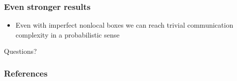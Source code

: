 \documentclass{beamer}
\begin{document}
\begin{frame}\frametitle{Even stronger results}
  \begin{itemize}
    \item Even with imperfect nonlocal boxes we can reach trivial communication
          complexity in a probabilistic sense
  \end{itemize}
\end{frame}

\begin{frame}
  \begin{center}
    Questions?
  \end{center}
\end{frame}

\begin{frame}[allowframebreaks]\frametitle{References}
  \nocite{*}
  \printbibliography
\end{frame}
\end{document}
